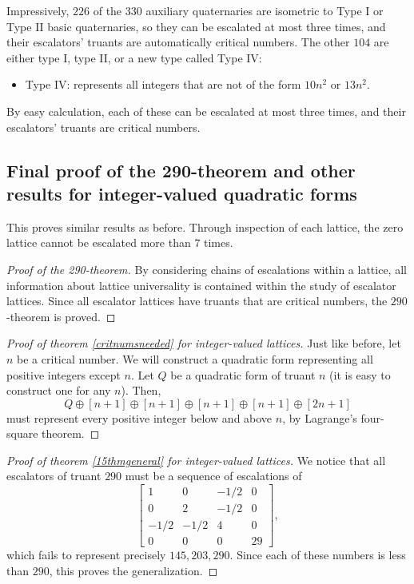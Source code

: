 \documentclass{article}
\begin{document}
Impressively, $226$ of the $330$ auxiliary quaternaries are isometric to Type I or Type II basic quaternaries, so they can be escalated at most three times, and their escalators' truants are automatically critical numbers. The other $104$ are either type I, type II, or a new type called Type IV:
\begin{itemize}
    \item Type IV: represents all integers that are not of the form $10n^2$ or $13n^2$.
\end{itemize}
By easy calculation, each of these can be escalated at most three times, and their escalators' truants are critical numbers.

\subsection{Final proof of the 290-theorem and other results for integer-valued quadratic forms}
This proves similar results as before. Through inspection of each lattice, the zero lattice cannot be escalated more than $7$ times.

\begin{proof}[Proof of the 290-theorem]
    By considering chains of escalations within a lattice, all information about lattice universality is contained within the study of escalator lattices. Since all escalator lattices have truants that are critical numbers, the $290$-theorem is proved.
\end{proof}

\begin{proof}[Proof of theorem \ref{critnumsneeded} for integer-valued lattices]
    Just like before, let $n$ be a critical number. We will construct a quadratic form representing all positive integers except $n$. Let $Q$ be a quadratic form of truant $n$ (it is easy to construct one for any $n$). Then,
    \[Q \oplus [n + 1] \oplus [n + 1] \oplus [n + 1] \oplus [n + 1] \oplus [2n + 1]\]
    must represent every positive integer below and above $n$, by Lagrange's four-square theorem.
\end{proof}

\begin{proof}[Proof of theorem \ref{15thmgeneral} for integer-valued lattices]
    We notice that all escalators of truant $290$ must be a sequence of escalations of
    \[\begin{bmatrix}
    1 & 0 & -1/2 & 0 \\
    0 & 2 & -1/2 & 0 \\
    -1/2 & -1/2 & 4 & 0 \\
    0 & 0 & 0 & 29
    \end{bmatrix},\]
    which fails to represent precisely $145, 203, 290$. Since each of these numbers is less than $290$, this proves the generalization.
\end{proof}
\end{document}
